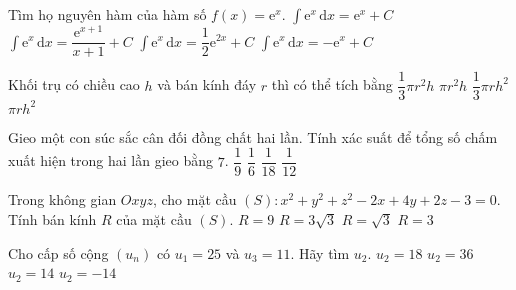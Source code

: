 \begin{ex}%
Tìm họ nguyên hàm của hàm số $f(x)=\mathrm{e}^x$.
\choice
{\True $\displaystyle\int\mathrm{e}^x\mathrm{\,d}x=\mathrm{e}^x+C$}
{$\displaystyle\int\mathrm{e}^x\mathrm{\,d}x=\dfrac{\mathrm{e}^{x+1}}{x+1}+C$}
{$\displaystyle\int\mathrm{e}^x\mathrm{\,d}x=\dfrac{1}{2}\mathrm{e}^{2x}+C$}
{$\displaystyle\int\mathrm{e}^x\mathrm{\,d}x=-\mathrm{e}^x+C$}
\end{ex}

\begin{ex}%
Khối trụ có chiều cao $h$ và bán kính đáy $r$ thì có thể tích bằng
\choice
{$\dfrac{1}{3}\pi r^2h$}
{\True $\pi r^2h$}
{$\dfrac{1}{3}\pi r h^2$}
{$\pi rh^2$}
\end{ex}

\begin{ex}%
Gieo một con súc sắc cân đối đồng chất hai lần. Tính xác suất để tổng số chấm xuất hiện trong hai lần gieo bằng $7$.
\choice
{$\dfrac{1}{9}$}
{\True $\dfrac{1}{6}$}
{$\dfrac{1}{18}$}
{$\dfrac{1}{12}$}
\end{ex}

\begin{ex}%
Trong không gian $Oxyz$, cho mặt cầu $(S):x^2+y^2+z^2-2x+4y+2z-3=0$. Tính bán kính $R$ của mặt cầu $(S)$.
\choice
{$R=9$}
{$R=3\sqrt3$}
{$R=\sqrt3$}
{\True $R=3$}
\end{ex}

\begin{ex}%
Cho cấp số cộng $(u_n)$ có $u_1=25$ và $u_3=11$. Hãy tìm $u_2$.
\choice
{\True $u_2=18$}
{$u_2=36$}
{$u_2=14$}
{$u_2=-14$}
\end{ex}

